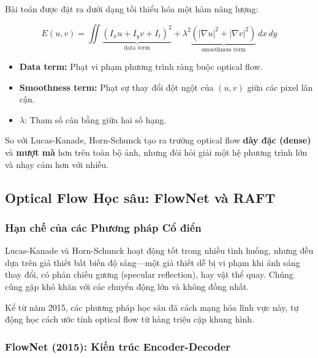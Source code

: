 Bài toán được đặt ra dưới dạng tối thiểu hóa một hàm năng lượng:

\begin{equation}
    E(u, v) = \iint \underbrace{\left(I_x u + I_y v + I_t\right)^2}_{\text{data term}} + \lambda^2 \underbrace{\left(|\nabla u|^2 + |\nabla v|^2\right)}_{\text{smoothness term}} \, dx\, dy
    \label{eq:horn_schunck_energy}
\end{equation}

\begin{itemize}
    \item \textbf{Data term:} Phạt vi phạm phương trình ràng buộc optical flow.
    \item \textbf{Smoothness term:} Phạt sự thay đổi đột ngột của $(u, v)$ giữa các pixel lân cận.
    \item $\lambda$: Tham số cân bằng giữa hai số hạng.
\end{itemize}

So với Lucas-Kanade, Horn-Schunck tạo ra trường optical flow \textbf{dày đặc (dense)} và \textbf{mượt mà} hơn trên toàn bộ ảnh, nhưng đòi hỏi giải một hệ phương trình lớn và nhạy cảm hơn với nhiễu.

\subsection{Optical Flow Học sâu: FlowNet và RAFT}
\label{subsec:deep_optical_flow}

\subsubsection{Hạn chế của các Phương pháp Cổ điển}
\label{subsubsec:classical_of_limitations}

Lucas-Kanade và Horn-Schunck hoạt động tốt trong nhiều tình huống, nhưng đều dựa trên giả thiết bất biến độ sáng—một giả thiết dễ bị vi phạm khi ánh sáng thay đổi, có phản chiếu gương (specular reflection), hay vật thể quay. Chúng cũng gặp khó khăn với các chuyển động lớn và không đồng nhất.

Kể từ năm 2015, các phương pháp học sâu đã cách mạng hóa lĩnh vực này, tự động học cách ước tính optical flow từ hàng triệu cặp khung hình.

\subsubsection{FlowNet (2015): Kiến trúc Encoder-Decoder}
\label{subsubsec:flownet}

